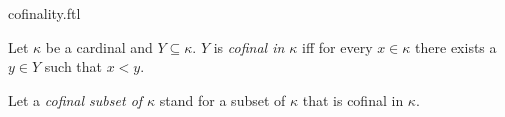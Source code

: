 \documentclass{naproche-library}
\begin{document}
\begin{smodule}[title=Cofinality]{cofinality.ftl}

\begin{definition}[forthel,id=SET_THEORY_06_5621203645212879]
  Let $\kappa$ be a cardinal and $Y \subseteq \kappa$.
  $Y$ is \emph{cofinal in $\kappa$} iff for every $x \in \kappa$ there exists a $y \in Y$ such that $x < y$.

  Let a \emph{cofinal subset of $\kappa$} stand for a subset of $\kappa$ that is cofinal in $\kappa$.
\end{definition}
\end{smodule}
\end{document}
